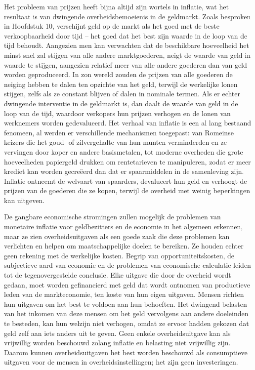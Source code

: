 Het probleem van prijzen heeft bijna altijd zijn wortels in inflatie, wat het resultaat is van dwingende overheidsbemoeienis in de geldmarkt. Zoals besproken in Hoofdstuk 10, verschijnt geld op de markt als het goed met de beste verkoopbaarheid door tijd -- het goed dat het best zijn waarde in de loop van de tijd behoudt. Aangezien men kan verwachten dat de beschikbare hoeveelheid het minst snel zal stijgen van alle andere marktgoederen, neigt de waarde van geld in waarde te stijgen, aangezien relatief meer van alle andere goederen dan van geld worden geproduceerd. In zo\textquotesingle n wereld zouden de prijzen van alle goederen de neiging hebben te dalen ten opzichte van het geld, terwijl de werkelijke lonen stijgen, zelfs als ze constant blijven of dalen in nominale termen. Als er echter dwingende interventie in de geldmarkt is, dan daalt de waarde van geld in de loop van de tijd, waardoor verkopers hun prijzen verhogen en de lonen van werknemers worden gedevalueerd. Het verhaal van inflatie is een al lang bestaand fenomeen, al werden er verschillende mechanismen toegepast: van Romeinse keizers die het goud- of zilvergehalte van hun munten verminderden en ze vervingen door koper en andere basismetalen, tot moderne overheden die grote hoeveelheden papiergeld drukken om rentetarieven te manipuleren, zodat er meer krediet kan worden gecreëerd dan dat er spaarmiddelen in de samenleving zijn.\autocite{183} Inflatie ontneemt de welvaart van spaarders, devalueert hun geld en verhoogt de prijzen van de goederen die ze kopen, terwijl de overheid met weinig beperkingen kan uitgeven.

De gangbare economische stromingen zullen mogelijk de problemen van monetaire inflatie voor geldbezitters en de economie in het algemeen erkennen, maar ze zien overheidsuitgaven als een goede zaak die deze problemen kan verlichten en helpen om maatschappelijke doelen te bereiken. Ze houden echter geen rekening met de werkelijke kosten. Begrip van opportuniteitskosten, de subjectieve aard van economie en de problemen van economische calculatie leiden tot de tegenovergestelde conclusie. Elke uitgave die door de overheid wordt gedaan, moet worden gefinancierd met geld dat wordt ontnomen van productieve leden van de markteconomie, ten koste van hun eigen uitgaven. Mensen richten hun uitgaven om het best te voldoen aan hun behoeften. Het dwingend belasten van het inkomen van deze mensen om het geld vervolgens aan andere doeleinden te besteden, kan hun welzijn niet verhogen, omdat ze ervoor hadden gekozen dat geld zelf aan iets anders uit te geven. Geen enkele overheidsuitgave kan als vrijwillig worden beschouwd zolang inflatie en belasting niet vrijwillig zijn. Daarom kunnen overheidsuitgaven het best worden beschouwd als consumptieve uitgaven voor de mensen in overheidsinstellingen; het zijn geen investeringen.

